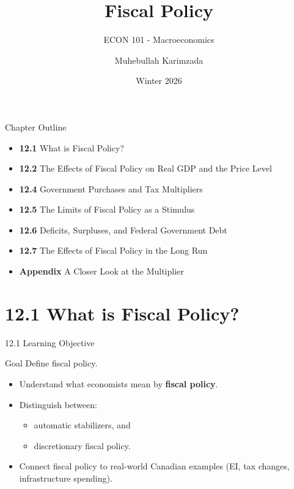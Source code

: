 \documentclass[aspectratio=169]{beamer}
\title{\textbf{Fiscal Policy \vspace{.5cm}\\  }}
\subtitle{ {\large ECON 101 - Macroeconomics}}
\author{Muhebullah Karimzada}
\date{Winter 2026}
\begin{document}
\begin{frame}[plain]
  \titlepage
\end{frame}

\begin{frame}{Chapter Outline}
\transfade
\begin{itemize}[<+->]
  \item \textbf{12.1} What is Fiscal Policy?
  \item \textbf{12.2} The Effects of Fiscal Policy on Real GDP and the Price Level
  \item \textbf{12.4} Government Purchases and Tax Multipliers
  \item \textbf{12.5} The Limits of Fiscal Policy as a Stimulus
  \item \textbf{12.6} Deficits, Surpluses, and Federal Government Debt
  \item \textbf{12.7} The Effects of Fiscal Policy in the Long Run
  \item \textbf{Appendix} A Closer Look at the Multiplier
\end{itemize}
\end{frame}

\section{12.1 What is Fiscal Policy?}

\begin{frame}{12.1 Learning Objective}
\transfade
\begin{block}{Goal}
Define fiscal policy.
\end{block}
\begin{itemize}[<+->]
  \item Understand what economists mean by \textbf{fiscal policy}.
  \item Distinguish between:
  \begin{itemize}[<+->]
    \item automatic stabilizers, and
    \item discretionary fiscal policy.
  \end{itemize}
  \item Connect fiscal policy to real-world Canadian examples (EI, tax changes, infrastructure spending).
\end{itemize}
\end{frame}
\end{document}
